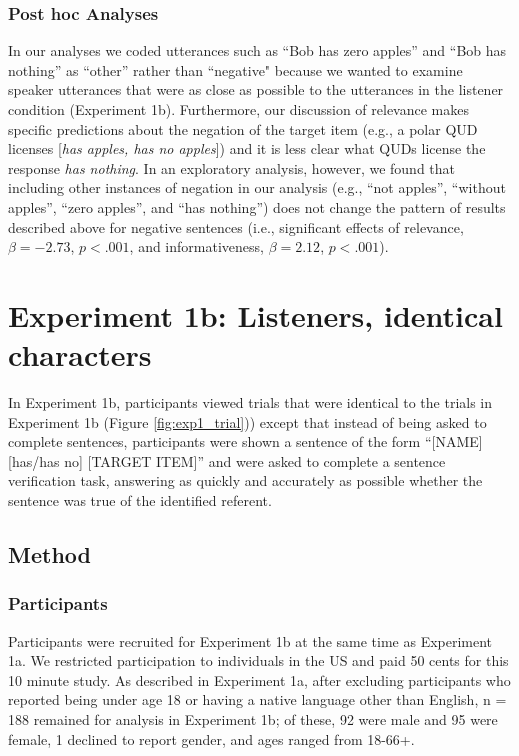 \documentclass[man, floatsintext, noapacite]{apa6}
\begin{document}
\subsubsection{Post hoc Analyses}

In our analyses we coded utterances such as ``Bob has zero apples'' and ``Bob has nothing'' as ``other'' rather than ``negative" because we wanted to examine speaker utterances that were as close as possible to the utterances in the listener condition (Experiment 1b). Furthermore, our discussion of relevance makes specific predictions about the negation of the target item (e.g., a polar QUD licenses [\textit{has apples, has no apples}]) and it is less clear what QUDs license the response \textit{has nothing}. In an exploratory analysis, however, we found that including other instances of negation in our analysis (e.g., ``not apples'', ``without apples'', ``zero apples'', and ``has nothing'') does not change the pattern of results described above for negative sentences (i.e., significant effects of relevance, $\beta= -2.73$, $p< .001$, and informativeness, $\beta= 2.12$, $p< .001$). 

\section{Experiment 1b: Listeners, identical characters}

In Experiment 1b, participants viewed trials that were identical to the trials in Experiment 1b (Figure \ref{fig:exp1_trial})) except that instead of being asked to complete sentences, participants were shown a sentence of the form ``[NAME] [has/has no] [TARGET ITEM]'' and were asked to complete a sentence verification task, answering as quickly and accurately as possible whether the sentence was true of the identified referent. 

\subsection{Method}

\subsubsection{Participants} 

Participants were recruited for Experiment 1b at the same time as Experiment 1a. We restricted participation to individuals in the US and paid 50 cents for this 10 minute study. As described in Experiment 1a, after excluding participants who reported being under age 18 or having a native language other than English, n = 188 remained for analysis in Experiment 1b; of these, 92 were male and 95 were female, 1 declined to report gender, and ages ranged from 18-66+.
\end{document}
